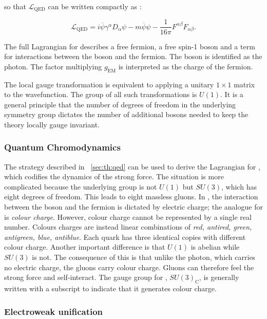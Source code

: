 so that $\mathcal{L}_{\textrm{QED}}$ can be written compactly as :

\begin{equation}
\label{eq:th:QED_lagrangian}
\mathcal{L}_{\textrm{QED}} = i\overline{\psi} \gamma^{\alpha} D_{\alpha} \psi - m\overline{\psi}\psi -\frac{1}{16\pi} F^{\alpha\beta}F_{\alpha\beta}.
\end{equation}

The full Lagrangian for \QED describes a free fermion, a free spin-1 boson and a term for interactions between the boson and the fermion. The boson is identified as the photon. The factor multiplying $g_{\textrm{EM}}$ is interpreted as the charge of the fermion.

The local gauge transformation is equivalent to applying a unitary $1\times1$ matrix to the wavefunction. The group of all such transformations is $U(1)$. It is a general principle that the number of degrees of freedom in the underlying symmetry group dictates the number of additional bosons needed to keep the theory locally gauge invariant. 

\subsubsection{Quantum Chromodynamics}

The strategy described in \Sec~\ref{sec:th:qed} can be used to derive the Lagrangian for \QCD, which codifies the dynamics of the strong force. The situation is more complicated because the underlying group is not $U(1)$ but $SU(3)$, which has eight degrees of freedom. This leads to eight massless gluons. In \QED, the interaction between the boson and the fermion is dictated by electric charge; the analogue for \QCD is \emph{colour charge}. However, colour charge cannot be represented by a single real number. Colours charges are instead linear combinations of \emph{red, antired, green, antigreen, blue, antiblue}. Each \SM quark has three identical copies with different colour charge. Another important difference is that $U(1)$ is abelian while $SU(3)$ is not. The consequence of this is that unlike the \QED photon, which carries no electric charge, the \QCD gluons carry colour charge. Gluons can therefore feel the strong force and self-interact. The gauge group for \QCD, $SU(3)_{\textrm{C}}$, is generally written with a subscript to indicate that it generates colour charge. 

\subsubsection{Electroweak unification}

